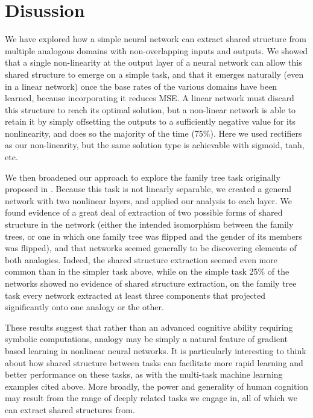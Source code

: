 \documentclass[10pt,letterpaper]{article}
\begin{document}
\section{Disussion}
We have explored how a simple neural network can extract shared structure from multiple analogous domains with non-overlapping inputs and outputs. We showed that a single non-linearity at the output layer of a neural network can allow this shared structure to emerge on a simple task, and that it emerges naturally (even in a linear network) once the base rates of the various domains have been learned, because incorporating it reduces MSE. A linear network must discard this structure to reach its optimal solution, but a non-linear network is able to retain it by simply offsetting the outputs to a sufficiently negative value for its nonlinearity, and does so the majority of the time (75\%). Here we used rectifiers as our non-linearity, but the same solution type is achievable with sigmoid, tanh, etc. \par 
We then broadened our approach to explore the family tree task originally proposed in \citet{Hinton1986}. Because this task is not linearly separable, we created a general network with two nonlinear layers, and applied our analysis to each layer. We found evidence of a great deal of extraction of two possible forms of shared structure in the network (either the intended isomorphism between the family trees, or one in which one family tree was flipped and the gender of its members was flipped), and that networks seemed generally to be discovering elements of both analogies. Indeed, the shared structure extraction seemed even more common than in the simpler task above, while on the simple task 25\% of the networks showed no evidence of shared structure extraction, on the family tree task every network extracted at least three components that projected significantly onto one analogy or the other. \par 
These results suggest that rather than an advanced cognitive ability requiring symbolic computations, analogy may be simply a natural feature of gradient based learning in nonlinear neural networks. It is particularly interesting to think about how shared structure between tasks can facilitate more rapid learning and better performance on these tasks, as with the multi-task machine learning examples cited above. More broadly, the power and generality of human cognition may result from the range of deeply related tasks we engage in, all of which we can extract shared structures from. 
\end{document}
